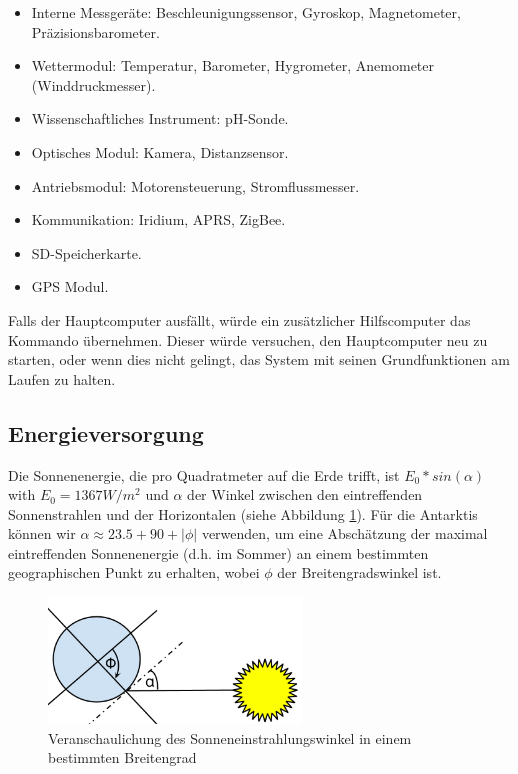 \documentclass[a4paper,12pt]{article}
\begin{document}
\begin{itemize}
\item Interne Messgeräte: Beschleunigungssensor, Gyroskop, Magnetometer, Präzisionsbarometer.
\item Wettermodul: Temperatur, Barometer, Hygrometer, Anemometer (Winddruckmesser).
\item Wissenschaftliches Instrument: pH-Sonde.
\item Optisches Modul: Kamera, Distanzsensor.
\item Antriebsmodul: Motorensteuerung, Stromflussmesser.
\item Kommunikation: Iridium, APRS, ZigBee.
\item SD-Speicherkarte.
\item GPS Modul.
\end{itemize}

Falls der Hauptcomputer ausfällt, würde ein zusätzlicher Hilfscomputer das Kommando übernehmen. Dieser würde versuchen, den Hauptcomputer neu zu starten, oder wenn dies nicht gelingt, das System mit seinen Grundfunktionen am Laufen zu halten.


\subsection{Energieversorgung}

Die Sonnenenergie, die pro Quadratmeter auf die Erde trifft, ist $E_0*sin(\alpha)$ with $E_0=1367 W/m^2$ \cite{solarc} und $\alpha$ der Winkel zwischen den eintreffenden Sonnenstrahlen und der Horizontalen (siehe Abbildung \ref{sunrayangle}). Für die Antarktis können wir $\alpha \approx 23.5+90+|\phi|$ verwenden, um eine Abschätzung der maximal eintreffenden Sonnenenergie (d.h. im Sommer) an einem bestimmten geographischen Punkt zu erhalten, wobei $\phi$ der Breitengradswinkel ist.


\begin{figure}[h!]
	\centering
    \includegraphics[width=0.6\textwidth]{sun}
    \caption{Veranschaulichung des Sonneneinstrahlungswinkel in einem bestimmten Breitengrad}
    \label{sunrayangle}
\end{figure}
\end{document}
